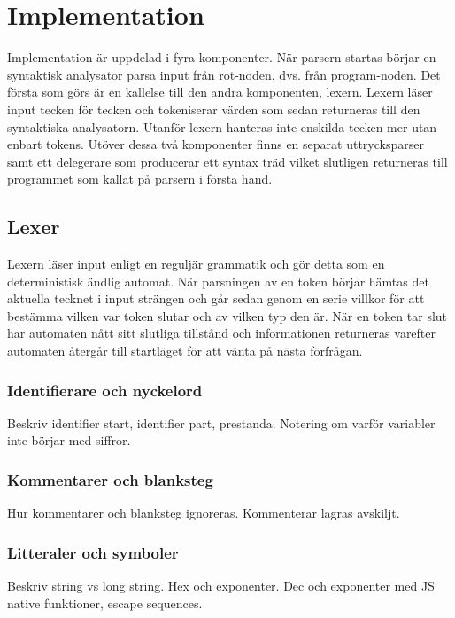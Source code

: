 \section{Implementation}

Implementation är uppdelad i fyra komponenter. När parsern startas börjar
en syntaktisk analysator parsa input från rot-noden, dvs. från program-noden.
Det första som görs är en kallelse till den andra komponenten, lexern. Lexern
läser input tecken för tecken och tokeniserar värden som sedan returneras
till den syntaktiska analysatorn. Utanför lexern hanteras inte enskilda tecken
mer utan enbart tokens. Utöver dessa två komponenter finns en separat
uttrycksparser samt ett delegerare som producerar ett syntax träd vilket
slutligen returneras till programmet som kallat på parsern i första hand.

\subsection{Lexer}

Lexern läser input enligt en reguljär grammatik och gör detta som en
deterministisk ändlig automat. När parsningen av en token börjar hämtas det
aktuella tecknet i input strängen och går sedan genom en serie villkor för att
bestämma vilken var token slutar och av vilken typ den är. När en token tar
slut har automaten nått sitt slutliga tillstånd och informationen returneras
varefter automaten återgår till startläget för att vänta på nästa förfrågan.

\subsubsection{Identifierare och nyckelord}

Beskriv identifier start, identifier part, prestanda. Notering om varför
variabler inte börjar med siffror.

\subsubsection{Kommentarer och blanksteg}

Hur kommentarer och blanksteg ignoreras. Kommenterar lagras avskiljt.

\subsubsection{Litteraler och symboler}

Beskriv string vs long string. Hex och exponenter. Dec och exponenter med JS
native funktioner, escape sequences.

